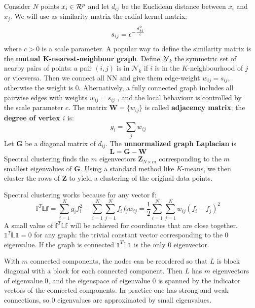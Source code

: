Consider $N$ points $x_i \in \CMcal{R}^p$ and let $d_{ij}$ be the Euclidean distance between $x_i$ and $x_j$. We will use as similarity matrix the radial-kernel matrix:
\begin{equation}
s_{ij} = \mathbf{\epsilon}^{-\frac{d_{ij}^2}{c}}
\end{equation}
where $c >0$ is a scale parameter. A popular way to define the similarity matrix is the \textbf{mutual K-nearest-neighbour graph}. Define $\mathcal{N}_k$ the symmetric set of nearby pairs of points: a pair $(i,j)$ is in $\mathcal{N}_k$ if $i$ is in the $K$-neighbourhood of $j$ or viceversa. Then we connect all NN and give them edge-weight $w_{ij} = s_{ij}$, otherwise the weight is $0$.
Alternatively, a fully connected graph includes all pairwise edges with weights $w_{ij} = s_{ij}$ , and the local behaviour is controlled by the scale parameter $c$.
The matrix $\mathbf{W} = \{w_{ij}\}$ is called \textbf{adjacency matrix}; the \textbf{degree of vertex $i$} is:
\begin{equation}
g_i = \sum_j w_{ij}
\end{equation}
Let $\mathbf{G}$ be a diagonal matrix of $d_{ij}$. The \textbf{unnormalized graph Laplacian} is
\begin{equation}
\mathbf{L} = \mathbf{G} -\mathbf{W}
\end{equation}
Spectral clustering finds the $m$ eigenvectors $\mathbf{Z}_{N\times m}$ corresponding to the $m$ smallest eigenvalues of $\mathbf{G}$.  Using a standard method like $K$-means, we then cluster the rows of $\mathbf{Z}$ to yield a clustering of the original data points.

Spectral clustering works because for any vector $\mathbb{f}$:
\begin{equation}
\mathbb{f}^T\mathbb{Lf}= \sum_{i=1}^Ng_i f_i^2 -\sum_{i=1}^N\sum_{j=1}^N f_i f_j w_{ij} = \frac{1}{2}\sum_{i=1}^N\sum_{j=1}^N  w_{ij}(f_i -f_j)^2 
\end{equation}
A small value of $\mathbb{f}^T\mathbb{Lf}$ will be achieved for coordinates that are close together.
$\mathbb{1}^T\mathbb{L1}=0$ for any graph: the trivial constant vector corresponding to the $0$ eigenvalue. If the graph is connected $\mathbb{1}^T\mathbb{L1}$ is the only $0$ eigenvector.

With $m$ connected components, the nodes can be reordered so that $L$ is block diagonal with a block for each connected component. Then $L$ has $m$ eigenvectors of eigenvalue $0$, and the eigenspace of eigenvalue $0$ is spanned by the indicator vectors of the connected components. In practice one has strong and weak connections, so $0$ eigenvalues are approximated by small eigenvalues.

